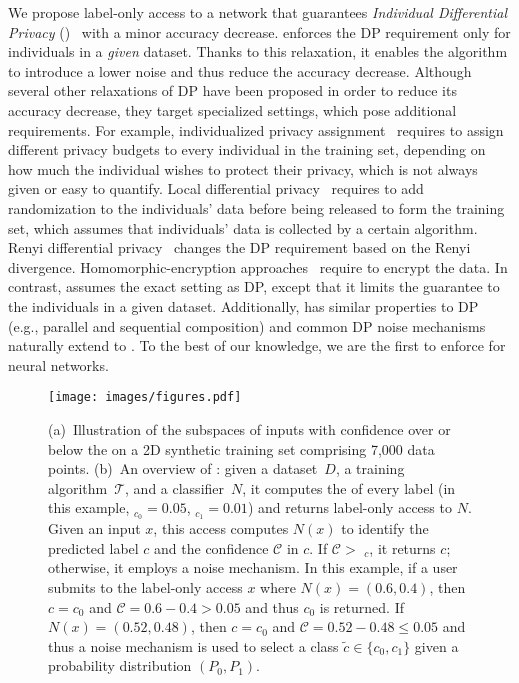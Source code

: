 We propose label-only access to a network that guarantees \emph{Individual Differential Privacy} (\propi)~\citep{ref_88,ref_90} with a minor accuracy decrease.
\propi enforces the DP requirement only for individuals in a \emph{given} dataset.
Thanks to this relaxation, it enables the algorithm to introduce a lower noise and thus reduce the accuracy decrease. 
Although several other relaxations of DP have been proposed in order to reduce its accuracy decrease, they target specialized settings, which pose additional requirements. For example, individualized privacy assignment~\cite{ref_94,ref_95} requires to assign different privacy budgets to every individual in the training set, depending on how much the individual wishes to protect their privacy, which is not always given or easy to quantify. 
Local differential privacy~\cite{ref_60,ref_97} requires to add randomization to the individuals' data before being released to form the training set, which assumes that individuals' data is collected by a certain algorithm. Renyi differential privacy~\cite{ref_98,ref_99} changes the DP requirement based on the Renyi divergence. Homomorphic-encryption approaches~\cite{ref_100,ref_101} require to encrypt the data. In contrast, \propi assumes the exact setting
as DP, except that it limits the guarantee to the individuals in a given dataset. Additionally, \propi 
has similar properties to DP (e.g., parallel and sequential composition) and common DP noise mechanisms naturally extend to \propi. 
To the best of our knowledge, we are the first to enforce \propi for neural networks. 

 \begin{figure*}[t]
    \centering
  \texttt{[image: images/figures.pdf]}
    \caption{(a)~Illustration of the subspaces of inputs with confidence over or below the \propa on a 2D synthetic training set comprising 7,000 data points. (b)~An overview of \tool:
     given a dataset~$D$, a training algorithm~$\mathcal{T}$, and a classifier~$N$, it computes the \propa of every label (in this example, {\propa}$_{c_0}=0.05$, {\propa}$_{c_1}=0.01$) 
     and returns
     \propi label-only access to $N$. Given an input $x$, this access computes $N(x)$ to identify the predicted label $c$ and the confidence $\mathcal{C}$ in $c$.
      If $\mathcal{C}>$ {\propa}$_c$, it returns $c$; otherwise, it employs a noise mechanism. In this example, if a user submits to the \propi label-only access $x$ where
      $N(x) = (0.6,0.4)$, 
       then $c=c_0$ and $\mathcal{C}=0.6-0.4>0.05$ and thus $c_0$ is returned. If $N(x) = (0.52,0.48)$, then $c=c_0$ and $\mathcal{C}=0.52-0.48\leq 0.05$ and thus a noise mechanism is used to select a class $\widetilde{c}\in\{c_0,c_1\}$ given a probability distribution $(P_0,P_1)$.} %
    \label{fig::intro}
\end{figure*}

